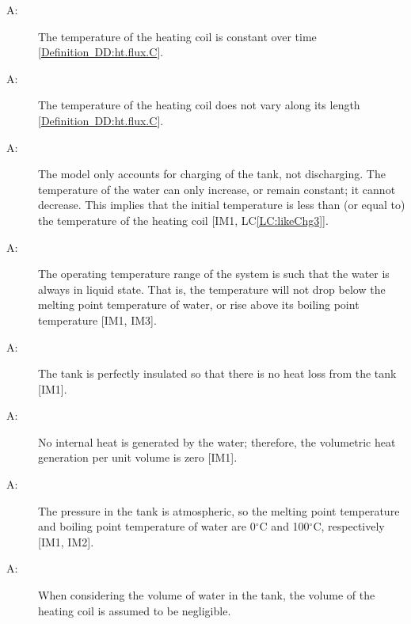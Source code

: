 \documentclass[12pt]{article}
\newcounter{assumpnum}
\newcommand{\atheassumpnum}{A\theassumpnum}
\begin{document}
\begin{description}
\item[\atheassumpnum\label{empty}:]The temperature of the heating coil is constant over time {[}\hyperref[DD:ht.flux.C]{Definition~DD:ht.flux.C}{]}.
\end{description}
\begin{description}
\item[\atheassumpnum\label{empty}:]The temperature of the heating coil does not vary along its length {[}\hyperref[DD:ht.flux.C]{Definition~DD:ht.flux.C}{]}.
\end{description}
\begin{description}
\item[\atheassumpnum\label{empty}:]The model only accounts for charging of the tank, not discharging. The temperature of the water can only increase, or remain constant; it cannot decrease. This implies that the initial temperature is less than (or equal to) the temperature of the heating coil {[}IM1, LC\ref{LC:likeChg3}{]}.
\end{description}
\begin{description}
\item[\atheassumpnum\label{empty}:]The operating temperature range of the system is such that the water is always in liquid state. That is, the temperature will not drop below the melting point temperature of water, or rise above its boiling point temperature {[}IM1, IM3{]}.
\end{description}
\begin{description}
\item[\atheassumpnum\label{empty}:]The tank is perfectly insulated so that there is no heat loss from the tank {[}IM1{]}.
\end{description}
\begin{description}
\item[\atheassumpnum\label{empty}:]No internal heat is generated by the water; therefore, the volumetric heat generation per unit volume is zero {[}IM1{]}.
\end{description}
\begin{description}
\item[\atheassumpnum\label{empty}:]The pressure in the tank is atmospheric, so the melting point temperature and boiling point temperature of water are 0${}^{\circ}$C and 100${}^{\circ}$C, respectively {[}IM1, IM2{]}.
\end{description}
\begin{description}
\item[\atheassumpnum\label{empty}:]When considering the volume of water in the tank, the volume of the heating coil is assumed to be negligible.
\end{description}
\end{document}
